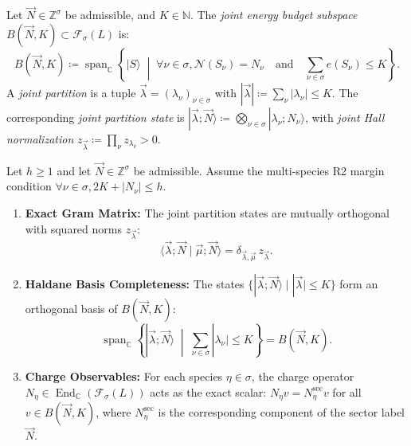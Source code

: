 \begin{definition}
\label{def:joint_energy_budget}
Let $\vec{N} \in \mathbb{Z}^\sigma$ be admissible, and $K \in \mathbb{N}$. The \emph{joint energy budget subspace} $B(\vec{N}, K) \subset \mathcal{F}_\sigma(L)$ is:
\begin{equation}
\label{eq:joint_budget_def}
B(\vec{N}, K) \coloneqq \operatorname{span}_{\mathbb{C}} \left\{ |S\rangle \;\middle|\; \forall \nu \in \sigma, \mathcal{N}(S_\nu) = N_\nu \quad \text{and} \quad \sum_{\nu \in \sigma} e(S_\nu) \le K \right\}.
\end{equation}
A \emph{joint partition} is a tuple $\vec{\lambda} = (\lambda_\nu)_{\nu \in \sigma}$ with $|\vec{\lambda}| \coloneqq \sum_\nu |\lambda_\nu| \le K$. The corresponding \emph{joint partition state} is $|\vec{\lambda}; \vec{N}\rangle \coloneqq \bigotimes_{\nu \in \sigma} |\lambda_\nu; N_\nu\rangle$, with \emph{joint Hall normalization} $z_{\vec{\lambda}} \coloneqq \prod_\nu z_{\lambda_\nu} > 0$.
\end{definition}

\begin{theorem}
\label{thm:joint_haldane_completeness}
Let $h \ge 1$ and let $\vec{N} \in \mathbb{Z}^\sigma$ be admissible. Assume the multi-species R2 margin condition $\forall \nu \in \sigma, 2K + |N_\nu| \le h$.
\begin{enumerate}
    \item \textbf{Exact Gram Matrix:} The joint partition states are mutually orthogonal with squared norms $z_{\vec{\lambda}}$:
    \begin{equation}
    \label{eq:joint_gram}
    \langle \vec{\lambda}; \vec{N} \mid \vec{\mu}; \vec{N} \rangle = \delta_{\vec{\lambda}, \vec{\mu}}\, z_{\vec{\lambda}}.
    \end{equation}
    \item \textbf{Haldane Basis Completeness:} The states $\{|\vec{\lambda}; \vec{N}\rangle \mid |\vec{\lambda}| \le K\}$ form an orthogonal basis of $B(\vec{N}, K)$:
    \begin{equation}
    \operatorname{span}_{\mathbb{C}} \left\{ |\vec{\lambda}; \vec{N}\rangle \;\middle|\; \sum_{\nu \in \sigma} |\lambda_\nu| \le K \right\} = B(\vec{N}, K).
    \end{equation}
    \item \textbf{Charge Observables:} For each species $\eta \in \sigma$, the charge operator $N_\eta \in \operatorname{End}_{\mathbb C}(\mathcal{F}_\sigma(L))$ acts as the exact scalar: $N_\eta v = N_\eta^{\mathrm{sec}} v$ for all $v \in B(\vec{N}, K)$, where $N_\eta^{\mathrm{sec}}$ is the corresponding component of the sector label $\vec{N}$.
\end{enumerate}
\end{theorem}

